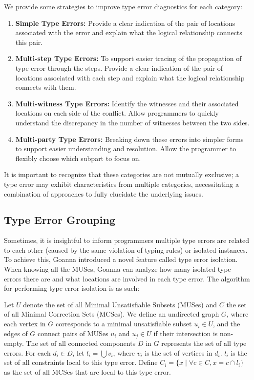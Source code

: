 \documentclass[pdflatex,lineno,sn-nature,Numbered]{sn-jnl}%
\begin{document}
We provide some strategies to improve type error diagnostics for each category:

\begin{enumerate}
  \item {
    \textbf{Simple Type Errors:}  Provide a clear indication of the pair of locations associated with the error and explain what the logical relationship connects this pair.
  }
  
  \item {
    \textbf{Multi-step Type Errors:} To support easier tracing of the propagation of type error through the steps. Provide a clear indication of the pair of locations associated with each step and explain what the logical relationship connects with them.
  }
  \item {
    \textbf{Multi-witness Type Errors:} Identify the witnesses and their associated locations on each side of the conflict. Allow programmers to quickly understand the discrepancy in the number of witnesses between the two sides.
  }
  \item {
    \textbf{Multi-party Type Errors:} Breaking down these errors into simpler forms to support easier understanding and resolution. Allow the programmer to flexibly choose which subpart to focus on.
  }
\end{enumerate}

It is important to recognize that these categories are not mutually exclusive; a type error may exhibit characteristics from multiple categories, necessitating a combination of approaches to fully elucidate the underlying issues.

\subsection{Type Error Grouping} \label{sub:grouping}

Sometimes, it is insightful to inform programmers multiple type errors are related to each other (caused by the same violation of typing rules) or isolated instances. To achieve this, Goanna introduced a novel feature called type error isolation. When knowing all the MUSes, Goanna can analyze how many isolated type errors there are and what locations are involved in each type error. The algorithm for performing type error isolation is as such:


	Let $U$ denote the set of all Minimal Unsatisfiable Subsets (MUSes) and $C$ the set of all Minimal Correction Sets (MCSes). We define an undirected graph $G$, where each vertex in $G$ corresponds to a minimal unsatisfiable subset $u_i \in U$, and the edges of $G$ connect pairs of MUSes $u_i$ and $u_j \in U$ if their intersection is non-empty. The set of all connected components $D$ in $G$ represents the set of all type errors. For each $d_i \in D$, let $l_i = \bigcup v_i$, where $v_i$ is the set of vertices in $d_i$. $l_i$ is the set of all constraints local to this type error. Define $C_i = \{ x \mid \forall c \in C, x = c \cap l_i \}$ as the set of all MCSes that are local to this type error.
\end{document}
